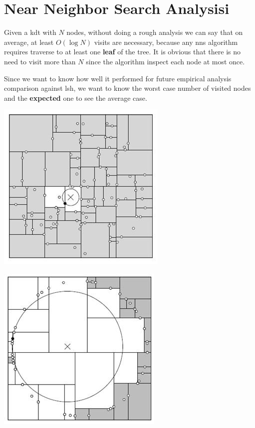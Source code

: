 \documentclass[12pt, a4paper]{article}
\begin{document}
\section{Near Neighbor Search Analysisi}

Given a \acrshort{kdt} with $N$ nodes, without doing a rough analysis we can say that on average, at least $O(\log{N})$ visits are necessary, because any \acrshort{nns} algorithm requires traverse to at least one \textbf{leaf} of the tree. It is obvious that there is no need to visit more than $N$ since the algorithm inspect each node at most once.

Since we want to know how well it performed for future empirical analysis comparison against \acrshort{lsh}, we want to know the worst case number of visited nodes and the \textbf{expected} one to see the average case.


\begin{minipage}[t]{\linewidth}
  \begin{center}
    \includegraphics{kdt_1}
  \end{center}
  \captionsetup{type=figure}
  \label{fig:kdt_1}
\end{minipage}


\begin{minipage}[t]{\linewidth}
   \begin{center}
    \includegraphics{kdt_2}
  \end{center}
  \captionsetup{type=figure}
  \label{fig:kdt_2}
\end{minipage}
\end{document}
